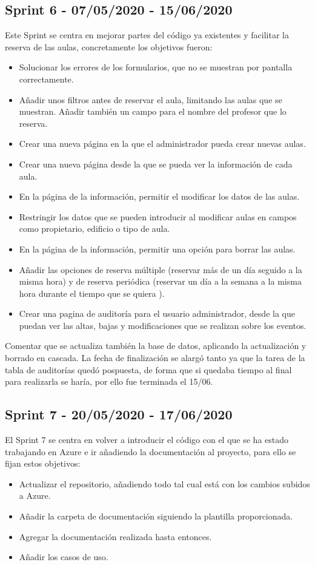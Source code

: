 \subsection{Sprint 6 - 07/05/2020 - 15/06/2020}
Este Sprint se centra en mejorar partes del código ya existentes y facilitar la reserva de las aulas, concretamente los objetivos fueron:
\begin{itemize}
    \item Solucionar los errores de los formularios, que no se muestran por pantalla correctamente.
    \item Añadir unos filtros antes de reservar el aula, limitando las aulas que se muestran. Añadir también un campo para el nombre del profesor que lo reserva.
    \item Crear una nueva página en la que el administrador pueda crear nuevas aulas.
    \item Crear una nueva página desde la que se pueda ver la información de cada aula.
    \item En la página de la información, permitir el modificar los datos de las aulas.
    \item Restringir los datos que se pueden introducir al modificar aulas en campos como propietario, edificio o tipo de aula.
    \item En la página de la información, permitir una opción para borrar las aulas.
    \item Añadir las opciones de reserva múltiple (reservar más de un día seguido a la misma hora) y de reserva periódica (reservar un día a la semana a la misma hora durante el tiempo que se quiera ).
    \item Crear una pagina de auditoría para el usuario administrador, desde la que puedan ver las altas, bajas y modificaciones que se realizan sobre los eventos.
\end{itemize}
Comentar que se actualiza también la base de datos, aplicando la actualización y borrado en cascada.
La fecha de finalización se alargó tanto ya que la tarea de la tabla de auditorías quedó pospuesta, de forma que si quedaba tiempo al final para realizarla se haría, por ello fue terminada el 15/06.

\subsection{Sprint 7 - 20/05/2020 - 17/06/2020}
El Sprint 7 se centra en volver a introducir el código con el que se ha estado trabajando en Azure e ir añadiendo la documentación al proyecto, para ello se fijan estos objetivos:
\begin{itemize}
    \item Actualizar el repositorio, añadiendo todo tal cual está con los cambios subidos a Azure.
    \item Añadir la carpeta de documentación siguiendo la plantilla proporcionada.
    \item Agregar la documentación realizada hasta entonces.
    \item Añadir los casos de uso.
\end{itemize}

